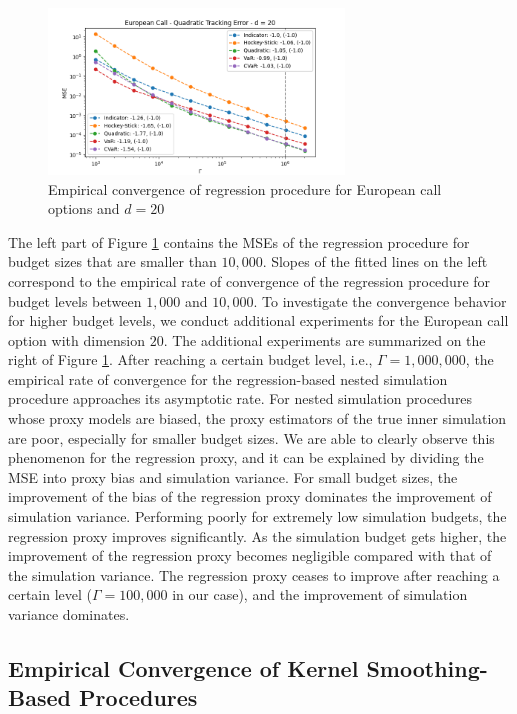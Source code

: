 \begin{figure}[ht]
    \centering
    \includegraphics[width=0.7\textwidth]{./project1/figures/figure3.png}
    \caption{Empirical convergence of regression procedure for European call options and $d=20$}
    \label{fig1:reg_lb} 
\end{figure}

The left part of Figure \ref{fig1:reg_lb} contains the MSEs of the regression procedure for budget sizes that are smaller than $10,000$. 
Slopes of the fitted lines on the left correspond to the empirical rate of convergence of the regression procedure for budget levels between $1,000$ and $10,000$.
To investigate the convergence behavior for higher budget levels, we conduct additional experiments for the European call option with dimension $20$. 
The additional experiments are summarized on the right of Figure \ref{fig1:reg_lb}.
After reaching a certain budget level, i.e., $\Gamma = 1,000,000$, the empirical rate of convergence for the regression-based nested simulation procedure approaches its asymptotic rate. 
For nested simulation procedures whose proxy models are biased, the proxy estimators of the true inner simulation are poor, especially for smaller budget sizes. 
We are able to clearly observe this phenomenon for the regression proxy, and it can be explained by dividing the MSE into proxy bias and simulation variance.
For small budget sizes, the improvement of the bias of the regression proxy dominates the improvement of simulation variance. 
Performing poorly for extremely low simulation budgets, the regression proxy improves significantly. 
As the simulation budget gets higher, the improvement of the regression proxy becomes negligible compared with that of the simulation variance. 
The regression proxy ceases to improve after reaching a certain level ($\Gamma = 100\!,\!000$ in our case), and the improvement of simulation variance dominates.

\subsection{Empirical Convergence of Kernel Smoothing-Based Procedures} \label{sec1:kernel-smoothing-convergence}

